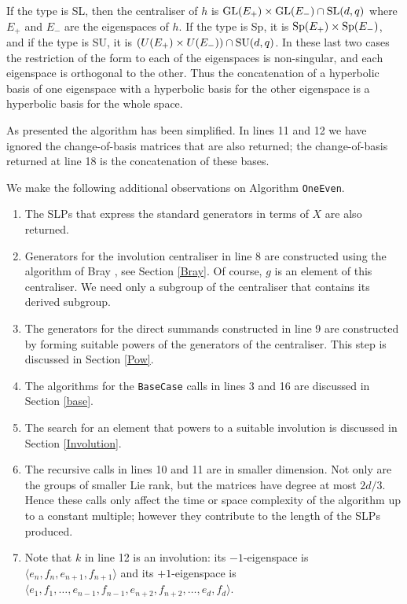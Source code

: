\documentclass[12pt]{article}
\def\SL{{\rm SL}}
\def\GL{{\rm GL}}
\def\Sp{{\rm Sp}}
\def\SU{{\rm SU}}
\begin{document}
If the type is SL, then the centraliser of $h$ is 
$\GL(E_+)\times\GL(E_-)\cap\SL(d,q)$ where $E_+$ and $E_-$ are the
eigenspaces  of $h$. If the type is Sp, it is
$\Sp(E_+)\times\Sp(E_-)$, and if the type is SU, it is
$(U(E_+)\times U(E_-))\cap\SU(d,q)$. In these last two
cases the restriction of the form to each of the eigenspaces is
non-singular, and each eigenspace is orthogonal to the other. Thus
the concatenation of a hyperbolic basis of one eigenspace with a
hyperbolic basis for the other eigenspace is a hyperbolic basis for
the whole space. 

As presented the algorithm has been simplified. 
In lines 11 and 12 we have ignored
the change-of-basis matrices that are also returned; the change-of-basis 
returned at line 18 is the concatenation of these bases.

We make the following additional observations on Algorithm {\tt OneEven}. 

\begin{enumerate}
\item 
The SLPs that express the standard generators 
in terms of $X$ are also returned.

\item 
Generators for the involution centraliser in line 
8 are constructed using the algorithm of Bray \cite{Bray},
see Section \ref{Bray}. Of course, $g$ is an element of
this centraliser. We need only a subgroup of the centraliser that 
contains its derived subgroup. 

\item 
The generators for the direct summands
constructed in line 9 are constructed by forming suitable powers of
the generators of the centraliser. This step is discussed in
Section \ref{Pow}.

\item 
The algorithms for the {\tt BaseCase} calls in lines 3 and 16 are 
discussed in Section \ref{base}.

\item 
The search for an element that powers to a suitable involution is
discussed in Section \ref{Involution}.

\item 
The recursive calls in lines 10 and 11 are
in smaller dimension. Not only are the groups of
smaller Lie rank, but the matrices have degree at most $2d/3$.
Hence these calls only affect the time or space complexity of the
algorithm up to a constant multiple; however they contribute to the length of
the SLPs produced.

\item 
Note that $k$ in line 12 is an involution: 
its $-1$-eigenspace is $\langle e_n,f_n,e_{n+1},f_{n+1}\rangle$ and its
$+1$-eigenspace is
$\langle e_1,f_1,\ldots, e_{n - 1}, f_{n-1}, e_{n+2},f_{n+2}, \ldots, e_d, f_d \rangle$.
\end{enumerate}
 
\end{document}
